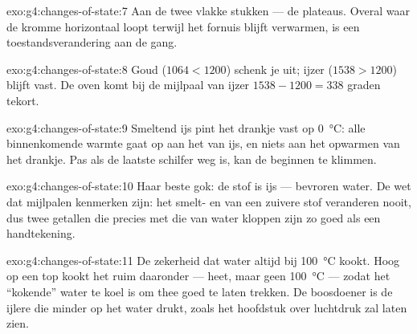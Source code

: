 \begin{solution}{exo:g4:changes-of-state:7}
Aan de twee vlakke stukken --- de plateaus. Overal waar de kromme
horizontaal loopt terwijl het fornuis blijft verwarmen, is een
toestandsverandering aan de gang.
\end{solution}

\begin{solution}{exo:g4:changes-of-state:8}
Goud ($1064 < 1200$) schenk je uit; ijzer ($1538 > 1200$) blijft
vast. De oven komt bij de mijlpaal van ijzer $1538 - 1200 = 338$
graden tekort.
\end{solution}

\begin{solution}{exo:g4:changes-of-state:9}
Smeltend ijs pint het drankje vast op \qty{0}{\celsius}: alle
binnenkomende warmte gaat op aan het  van ijs, en niets aan het
opwarmen van het drankje. Pas als de laatste schilfer weg is, kan de
 beginnen te klimmen.
\end{solution}

\begin{solution}{exo:g4:changes-of-state:10}
Haar beste gok: de stof is ijs --- bevroren water. De wet dat
mijlpalen kenmerken zijn: het smelt- en  van een zuivere
stof veranderen nooit, dus twee getallen die precies met die van water
kloppen zijn zo goed als een handtekening.
\end{solution}

\begin{solution}{exo:g4:changes-of-state:11}
De zekerheid dat water altijd bij \qty{100}{\celsius} kookt. Hoog op
een top kookt het ruim daaronder --- heet, maar geen
\qty{100}{\celsius} --- zodat het ``kokende'' water te koel is om thee
goed te laten trekken. De boosdoener is de ijlere  die minder op
het water drukt, zoals het hoofdstuk over luchtdruk zal laten zien.
\end{solution}
